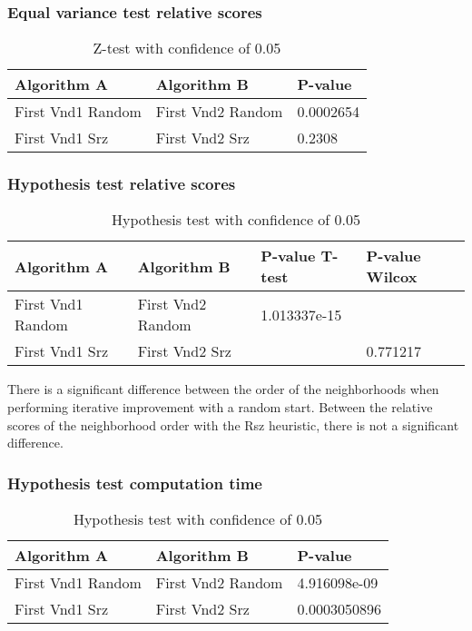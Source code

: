\documentclass[]{article}
\begin{document}
	
	\subsubsection{Equal variance test relative scores}
	
	\begin{table}[H]
		\centering
		\caption{Z-test with confidence of 0.05}
		\label{tab:table1}
		\begin{tabular}{lll}
			\toprule
			Algorithm A & Algorithm B & P-value\\
			\midrule
			First Vnd1 Random&First Vnd2 Random&\color{OliveGreen}0.0002654\\ 
			First Vnd1 Srz&First Vnd2 Srz&\color{Red}0.2308\\ 
			
			\bottomrule
		\end{tabular}
	\end{table}
	
	
	\subsubsection{Hypothesis test relative scores}
	
	
	\begin{table}[H]
		\centering
		\caption{Hypothesis test with confidence of 0.05}
		\label{tab:table1}
		\begin{tabular}{llll}
			\toprule
			Algorithm A & Algorithm B & P-value T-test & P-value Wilcox\\
			\midrule
			First Vnd1 Random&First Vnd2 Random&\color{OliveGreen}1.013337e-15&\\
			First Vnd1 Srz&First Vnd2 Srz&&\color{Red}0.771217\\
			
			\bottomrule
		\end{tabular}
	\end{table}
	
	There is a significant difference between the order of the neighborhoods when performing iterative improvement with a random start.
	Between the relative scores of the neighborhood order with the Rsz heuristic, there is not a significant difference.
	
	\subsubsection{Hypothesis test computation time}
	
	\begin{table}[H]
		\centering
		\caption{Hypothesis test with confidence of 0.05}
		\label{tab:table1}
		\begin{tabular}{ll{|}l}
			\toprule
			Algorithm A & Algorithm B & P-value\\
			\midrule
			First Vnd1 Random&First Vnd2 Random&\color{OliveGreen}4.916098e-09\\ 
			First Vnd1 Srz&First Vnd2 Srz&\color{OliveGreen}0.0003050896\\ 
			
			
			\bottomrule
		\end{tabular}
	\end{table}
	
\end{document}
